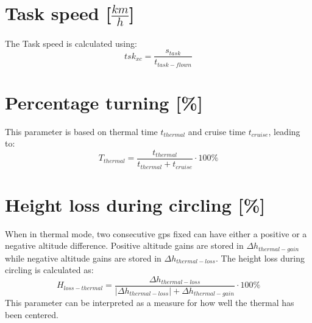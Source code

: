\section{Task speed [$\frac{km}{h}$]}
The Task speed is calculated using:
\begin{equation}
{tsk_{xc}} = \frac{{{s_{task}}}}{{{t_{task - flown}}}}
\end{equation}

\section{Percentage turning [\%]}
This parameter is based on thermal time ${{t_{thermal}}}$ and cruise time ${{t_{cruise}}} $, leading to:
\begin{equation}
{T_{thermal}} = \frac{{{t_{thermal}}}}{{{t_{thermal}} + {t_{cruise}}}} \cdot 100\% 
\end{equation}

\section{Height loss during circling [\%]}
When in thermal mode, two consecutive gps fixed can have either a positive or a negative altitude difference. Positive altitude gains are stored in $\Delta {h_{thermal-gain}}$ while negative altitude gains are stored in ${\Delta {h_{thermal-loss}}}$. The height loss during circling is calculated as:
\begin{equation}
{H_{loss - thermal}} = \frac{{\Delta {h_{thermal - loss}}}}{{\left| {\Delta {h_{thermal - loss}}} \right| + \Delta {h_{thermal - gain}}}} \cdot 100\% 
\end{equation}
This parameter can be interpreted as a measure for how well the thermal has been centered.